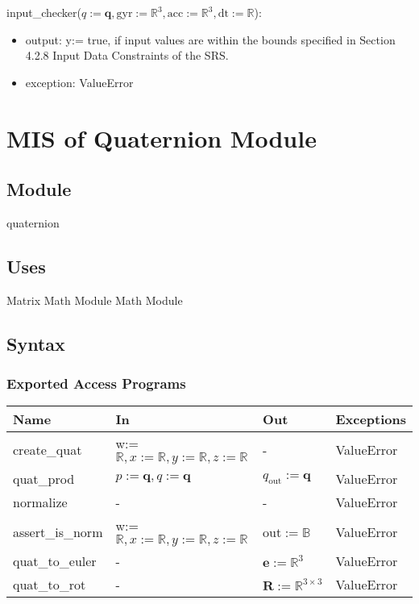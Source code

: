 \documentclass[12pt, titlepage]{article}
\begin{document}
\noindent input\_checker($q:=\mathbf{q}, \text{gyr}:=\mathbb{R}^3, \text{acc}:=\mathbb{R}^3, \text{dt}:=\mathbb{R}$):
\begin{itemize}
\item output: y:= true, if input values are within the bounds specified in Section 4.2.8 Input Data Constraints of the SRS.
\item exception: ValueError
\end{itemize}

\newpage

\section{MIS of Quaternion Module} \label{qm}

\subsection{Module}
quaternion

\subsection{Uses}
Matrix Math Module \newline
Math Module

\subsection{Syntax}

\subsubsection{Exported Access Programs}

\begin{center}
\begin{tabular}{p{2.5cm} p{6cm} p{2cm} p{1.5cm}}
\hline
\textbf{Name} & \textbf{In} & \textbf{Out} & \textbf{Exceptions} \\
\hline
create\_quat & w:=$\mathbb{R}, x:=\mathbb{R}, y:=\mathbb{R}, z:=\mathbb{R}$ & - & ValueError \\
quat\_prod & $p:=\mathbf{q},  q:=\mathbf{q}$ & $q_\text{out}:=\mathbf{q}$ & ValueError \\
normalize & - & - & ValueError \\
assert\_is\_norm & w:=$\mathbb{R}, x:=\mathbb{R}, y:=\mathbb{R}, z:=\mathbb{R}$ & out$:=\mathbb{B}$
& ValueError \\
quat\_to\_euler & - & $\mathbf{e}:=\mathbb{R}^3$ & ValueError \\
quat\_to\_rot & - & $\mathbf{R} := \mathbb{R}^{3 \times 3}$ & ValueError \\
\hline
\end{tabular}
\end{center}
\end{document}
